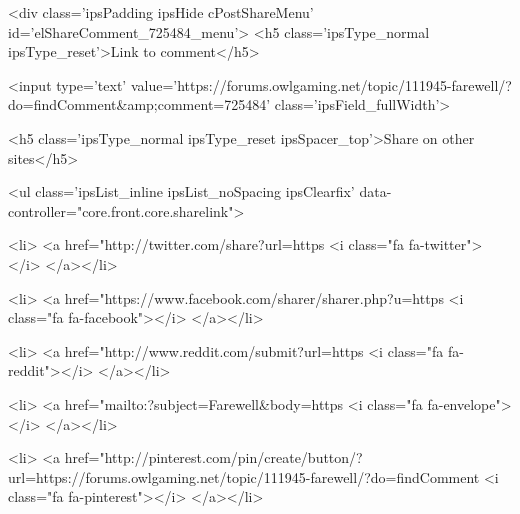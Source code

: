 	

	



<div class='ipsPadding ipsHide cPostShareMenu' id='elShareComment_725484_menu'>
	<h5 class='ipsType_normal ipsType_reset'>Link to comment</h5>
	
		
	
	
	<input type='text' value='https://forums.owlgaming.net/topic/111945-farewell/?do=findComment&amp;comment=725484' class='ipsField_fullWidth'>

	
	<h5 class='ipsType_normal ipsType_reset ipsSpacer_top'>Share on other sites</h5>
	

	<ul class='ipsList_inline ipsList_noSpacing ipsClearfix' data-controller="core.front.core.sharelink">
		
			<li>
<a href="http://twitter.com/share?url=https%
	<i class="fa fa-twitter"></i>
</a></li>
		
			<li>
<a href="https://www.facebook.com/sharer/sharer.php?u=https%
	<i class="fa fa-facebook"></i>
</a></li>
		
			<li>
<a href="http://www.reddit.com/submit?url=https%
	<i class="fa fa-reddit"></i>
</a></li>
		
			<li>
<a href="mailto:?subject=Farewell&body=https%
	<i class="fa fa-envelope"></i>
</a></li>
		
			<li>
<a href="http://pinterest.com/pin/create/button/?url=https://forums.owlgaming.net/topic/111945-farewell/?do=findComment%
	<i class="fa fa-pinterest"></i>
</a></li>
		

